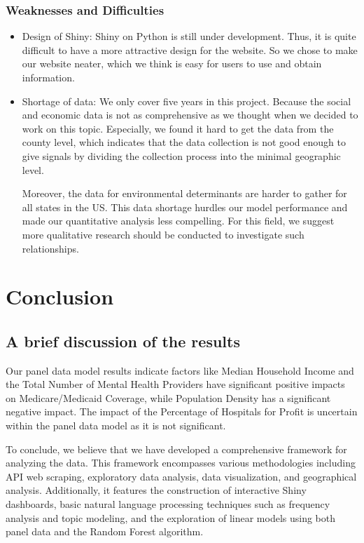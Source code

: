 \documentclass{article}
\begin{document}
\subsubsection{Weaknesses and Difficulties}
\begin{itemize}
    \item Design of Shiny: Shiny on Python is still under development. Thus, it is quite difficult to have a more attractive design for the website. So we chose to make our website neater, which we think is easy for users to use and obtain information. 
    \item Shortage of data: We only cover five years in this project. Because the social and economic data is not as comprehensive as we thought when we decided to work on this topic. Especially, we found it hard to get the data from the county level, which indicates that the data collection is not good enough to give signals by dividing the collection process into the minimal geographic level. 

Moreover, the data for environmental determinants are harder to gather for all states in the US. This data shortage hurdles our model performance and made our quantitative analysis less compelling. For this field, we suggest more qualitative research should be conducted to investigate such relationships. 

\end{itemize}
\section{Conclusion}
\subsection{A brief discussion of the results}

Our panel data model results indicate factors like Median Household Income and the Total Number of Mental Health Providers have significant positive impacts on Medicare/Medicaid Coverage, while Population Density has a significant negative impact. The impact of the Percentage of Hospitals for Profit is uncertain within the panel data model as it is not significant.  

To conclude, we believe that we have developed a comprehensive framework for analyzing the data. This framework encompasses various methodologies including API web scraping, exploratory data analysis, data visualization, and geographical analysis. Additionally, it features the construction of interactive Shiny dashboards, basic natural language processing techniques such as frequency analysis and topic modeling, and the exploration of linear models using both panel data and the Random Forest algorithm.
\end{document}
